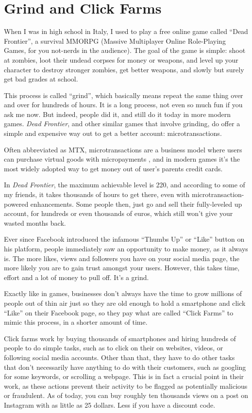 \section{Grind and Click Farms}
\label{chap:clickfarms}

When I was in high school in Italy, I used to play a free online game called ``Dead Frontier'', a survival MMORPG (Massive Multiplayer Online Role-Playing Games, for you not-nerds in the audience). The goal of the game is simple: shoot at zombies, loot their undead corpses for money or weapons, and level up your character to destroy stronger zombies, get better weapons, and slowly but surely get bad grades at school.

This process is called ``grind'', which basically means repeat the same thing over and over for hundreds of hours. It is a long process, not even so much fun if you ask me now. But indeed, people did it, and still do it today in more modern games. \textit{Dead Frontier}, and other similar games that involve grinding, do offer a simple and expensive way out to get a better account: microtransactions.

Often abbreviated as MTX, microtransactions are a business model where users can purchase virtual goods with micropayments \cite{microtransaction_2021}, and in modern games it's the most widely adopted way to get money out of user's parents credit cards.

In \textit{Dead Frontier}, the maximum achievable level is 220, and according to some of my friends, it takes thousands of hours to get there, even with microtransaction-powered enhancements. Some people then, just go and sell their fully-leveled up account, for hundreds or even thousands of euros, which still won't give your wasted months back.

Ever since Facebook introduced the infamous ``Thumbs Up'' or ``Like'' button on his platform, people immediately saw an opportunity to make money, as it always is. The more likes, views and followers you have on your social media page, the more likely you are to gain trust amongst your users. However, this takes time, effort and a lot of money to pull off. It's a grind.

Exactly like in games, businesses don't always have the time to grow millions of people out of thin air just so they are old enough to hold a smartphone and click ``Like'' on their Facebook page, so they pay what are called ``Click Farms'' to mimic this process, in a shorter amount of time.

Click farms work by buying thousands of smartphones and hiring hundreds of people to do simple tasks, such as to click on their on websites, videos, or following social media accounts. Other than that, they have to do other tasks that don't necessarily have anything to do with their customers, such as googling for some keywords, or scrolling a webpage. This is in fact a crucial point in their work, as these actions prevent their activity to be flagged as potentially malicious or fraudulent. As of today, you can buy roughly ten thousands views on a post on Instagram with as little as 25 dollars. Less if you have a discount code.


